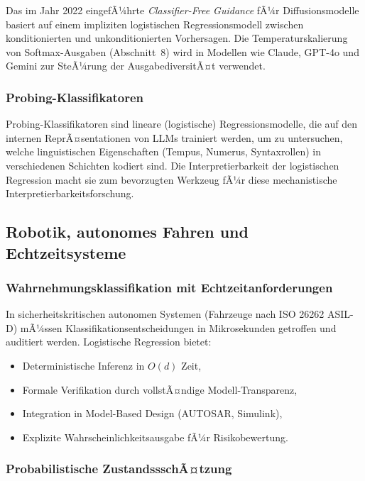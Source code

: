 ﻿\documentclass[12pt, a4paper]{article}
\theoremstyle{definition}
\theoremstyle{remark}
\begin{document}
Das im Jahr 2022 eingefÃ¼hrte \emph{Classifier-Free Guidance} fÃ¼r Diffusionsmodelle
basiert auf einem impliziten logistischen Regressionsmodell zwischen konditionierten und
unkonditionierten Vorhersagen. Die Temperaturskalierung von Softmax-Ausgaben (Abschnitt~8)
wird in Modellen wie Claude, GPT-4o und Gemini zur SteÃ¼rung der AusgabediversitÃ¤t verwendet.

\subsubsection{Probing-Klassifikatoren}

Probing-Klassifikatoren sind lineare (logistische) Regressionsmodelle, die auf den internen
ReprÃ¤sentationen von LLMs trainiert werden, um zu untersuchen, welche linguistischen
Eigenschaften (Tempus, Numerus, Syntaxrollen) in verschiedenen Schichten kodiert sind.
Die Interpretierbarkeit der logistischen Regression macht sie zum bevorzugten Werkzeug
fÃ¼r diese mechanistische Interpretierbarkeitsforschung.

\subsection{Robotik, autonomes Fahren und Echtzeitsysteme}

\subsubsection{Wahrnehmungsklassifikation mit Echtzeitanforderungen}

In sicherheitskritischen autonomen Systemen (Fahrzeuge nach ISO 26262 ASIL-D) mÃ¼ssen
Klassifikationsentscheidungen in Mikrosekunden getroffen und auditiert werden. Logistische
Regression bietet:
\begin{itemize}
  \item Deterministische Inferenz in $O(d)$ Zeit,
  \item Formale Verifikation durch vollstÃ¤ndige Modell-Transparenz,
  \item Integration in Model-Based Design (AUTOSAR, Simulink),
  \item Explizite Wahrscheinlichkeitsausgabe fÃ¼r Risikobewertung.
\end{itemize}

\subsubsection{Probabilistische ZustandssschÃ¤tzung}
\end{document}
